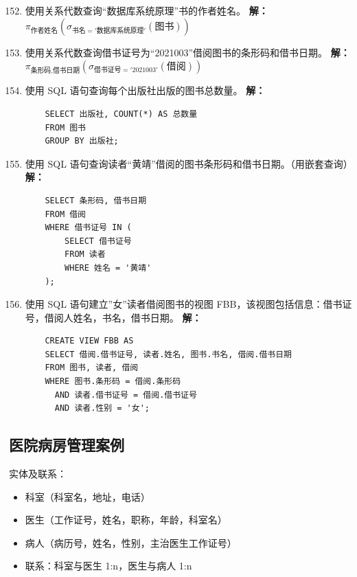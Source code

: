 \documentclass[12pt, a4paper]{article}
\begin{document}
\begin{enumerate}[label=\arabic*.]
    \setcounter{enumi}{151}
    \item 使用关系代数查询“数据库系统原理”书的作者姓名。
    \textbf{解：} $\pi_{\text{作者姓名}}(\sigma_{\text{书名}='数据库系统原理'}(\text{图书}))$

    \item 使用关系代数查询借书证号为“2021003”借阅图书的条形码和借书日期。
    \textbf{解：} $\pi_{\text{条形码}, \text{借书日期}}(\sigma_{\text{借书证号}='2021003'}(\text{借阅}))$

    \item 使用 SQL 语句查询每个出版社出版的图书总数量。
    \textbf{解：}
    \begin{verbatim}
    SELECT 出版社, COUNT(*) AS 总数量 
    FROM 图书 
    GROUP BY 出版社;
    \end{verbatim}

    \item 使用 SQL 语句查询读者“黄靖”借阅的图书条形码和借书日期。（用嵌套查询）
    \textbf{解：}
    \begin{verbatim}
    SELECT 条形码, 借书日期 
    FROM 借阅 
    WHERE 借书证号 IN (
        SELECT 借书证号 
        FROM 读者 
        WHERE 姓名 = '黄靖'
    );
    \end{verbatim}

    \item 使用 SQL 语句建立”女”读者借阅图书的视图 FBB，该视图包括信息：借书证号，借阅人姓名，书名，借书日期。
    \textbf{解：}
    \begin{verbatim}
    CREATE VIEW FBB AS
    SELECT 借阅.借书证号, 读者.姓名, 图书.书名, 借阅.借书日期
    FROM 图书, 读者, 借阅
    WHERE 图书.条形码 = 借阅.条形码 
      AND 读者.借书证号 = 借阅.借书证号 
      AND 读者.性别 = '女';
    \end{verbatim}
\end{enumerate}

\subsection*{医院病房管理案例}
实体及联系：
\begin{itemize}
    \item 科室（科室名，地址，电话）
    \item 医生（工作证号，姓名，职称，年龄，科室名）
    \item 病人（病历号，姓名，性别，主治医生工作证号）
    \item 联系：科室与医生 1:n，医生与病人 1:n
\end{itemize}
\end{document}
